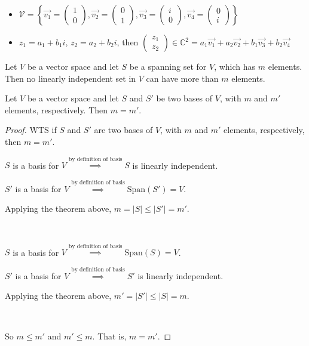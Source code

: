 \documentclass[11pt,fleqn]{book} %
\begin{document}
\begin{example}
\begin{itemize}
\begin{itemize}
            \item $\mathcal{V} = \left\{ \overrightarrow{v_1} = \begin{pmatrix} 1\\0 \end{pmatrix}, \overrightarrow{v_2} = \begin{pmatrix} 0\\1 \end{pmatrix}, \overrightarrow{v_3} = \begin{pmatrix} i\\0 \end{pmatrix}, \overrightarrow{v_4} = \begin{pmatrix} 0\\i \end{pmatrix} \right\}$
            \item $z_1 = a_1 + b_1i$, $z_2 = a_2+b_2i$, then $\begin{pmatrix} z_1\\z_2 \end{pmatrix} \in \mathbb{C}^2 = a_1\overrightarrow{v_1} + a_2\overrightarrow{v_2} + b_1\overrightarrow{v_3} + b_2\overrightarrow{v_4}$
        \end{itemize}
    \end{itemize}
\end{example}

\setcounter{dummy}{9}
\begin{theorem}
    Let $V$ be a  vector space and let $S$ be a spanning set for $V$, which has $m$ elements. Then no linearly independent set in $V$ can have more than $m$ elements. 
\end{theorem}

\begin{corollary}
    Let $V$ be a vector space and let $S$ and $S'$ be two bases of $V$, with $m$ and $m'$ elements, respectively. Then $m = m'$.
\end{corollary}

\begin{proof}
    WTS if $S$ and $S'$ are two bases of $V$, with $m$ and $m'$ elements, respectively, then $m = m'$.

    $S$ is a basis for $V \overset{\text{by definition of basis}}{\implies} S$ is linearly independent. 

    $S'$ is a basis for $V \overset{\text{by definition of basis}}{\implies} \mathrm{Span}(S')=V$. 

    Applying the theorem above, $m = |S| \le |S'| = m'$. 
    
    {~~~}

    $S$ is a basis for $V \overset{\text{by definition of basis}}{\implies} \mathrm{Span}(S)=V$. 
    
    $S'$ is a basis for $V \overset{\text{by definition of basis}}{\implies} S'$ is linearly independent. 

    Applying the theorem above, $m' = |S'| \le |S| = m$. 
    
    {~~~}
    
    So $m \le m'$ and $m' \le m$. That is, $m = m'$. 
\end{proof}
\end{document}
